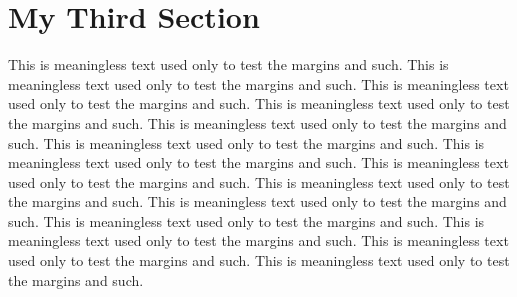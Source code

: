 \section{My Third Section}

This is meaningless text used only to test the margins and such.
This is meaningless text used only to test the margins and such.
This is meaningless text used only to test the margins and such.
This is meaningless text used only to test the margins and such.
This is meaningless text used only to test the margins and such.
This is meaningless text used only to test the margins and such.
This is meaningless text used only to test the margins and such.
This is meaningless text used only to test the margins and such.
This is meaningless text used only to test the margins and such.
This is meaningless text used only to test the margins and such.
This is meaningless text used only to test the margins and such.
This is meaningless text used only to test the margins and such.
This is meaningless text used only to test the margins and such.
This is meaningless text used only to test the margins and such.

